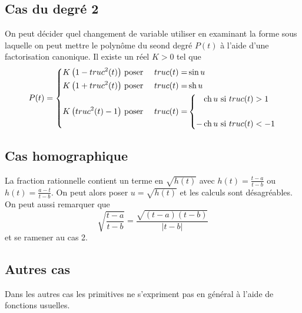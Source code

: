 \subsection{Cas du degré 2}
On peut décider quel changement de variable utiliser en examinant la forme sous laquelle on peut mettre le polynôme du seond degré $P(t)$ à l'aide d'une factorisation canonique. Il existe un réel $K>0$ tel que 
\begin{displaymath}
 P(t)=\left\lbrace
\begin{aligned}
 K\left( 1 - truc^2(t)\right)& \text{ poser }& truc(t)=&\sin u \\ 
 K\left( 1 + truc^2(t)\right)& \text{ poser }& truc(t)=&\mathop{\mathrm{sh}} u \\ 
K\left( truc^2(t) -1 \right)& \text{ poser }& truc(t)=&
\left\lbrace
\begin{aligned}
  \mathop{\mathrm{ch}} u &\text{ si } truc(t)>1\\ \\
  -\mathop{\mathrm{ch}} u &\text{ si } truc(t)<-1
\end{aligned} \right. 
\end{aligned} \right. 
\end{displaymath}

\subsection{Cas homographique}
La fraction rationnelle contient un terme en $\sqrt{h(t)}$ avec  $h(t) = \frac{t-a}{t-b}$ ou $h(t) = \frac{a-t}{t-b}$. On peut alors poser $u=\sqrt{h(t)}$ et les calculs sont désagréables. On peut aussi remarquer que
\begin{displaymath}
 \sqrt{\frac{t-a}{t-b}} = \frac{\sqrt{(t-a)(t-b)}}{|t-b|}
\end{displaymath}
et se ramener au cas 2.
\subsection{Autres cas}
Dans les autres cas les primitives ne s'expriment pas en général à l'aide de fonctions usuelles.

